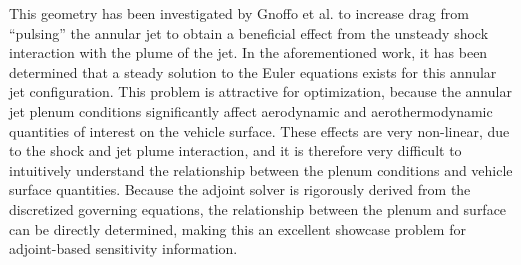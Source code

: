 This geometry has been investigated by Gnoffo et al.\cite{gnoffo2016tapping} to
increase drag from ``pulsing'' the annular jet to obtain a beneficial effect
from the unsteady shock interaction with the plume of the jet.  In the
aforementioned work, it has been determined that a steady solution to the Euler
equations exists for this annular jet configuration.  This problem is attractive
for optimization, because the annular jet plenum conditions significantly affect
aerodynamic and aerothermodynamic quantities of interest on the vehicle surface.
These effects are very non-linear, due to the shock and jet plume interaction,
and it is therefore very difficult to intuitively understand the relationship
between the plenum conditions and vehicle surface quantities.  Because the
adjoint solver is rigorously derived from the discretized governing equations,
the relationship between the plenum and surface can be directly determined,
making this an excellent showcase problem for adjoint-based sensitivity
information.

